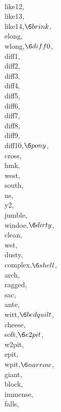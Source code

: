 \\{like12},\\{like13},\\{like14},{}$\6
\\{brink}${},\\{elong},\\{wlong},{}$\6
\\{diff0}${},\\{diff1},\\{diff2},\\{diff3},\\{diff4},\\{diff5},%
\\{diff6},\\{diff7},\\{diff8},\\{diff9},\\{diff10},{}$\6
\\{pony}${},\\{cross},\\{hmk},\\{west},\\{south},\\{ns},%
\\{y2},\\{jumble},\\{windoe},{}$\6
\\{dirty}${},\\{clean},\\{wet},\\{dusty},\\{complex},{}$\6
\\{shell}${},\\{arch},\\{ragged},\\{sac},\\{ante},\\{witt},{}$\6
\\{bedquilt}${},\\{cheese},\\{soft},{}$\6
\\{e2pit}${},\\{w2pit},\\{epit},\\{wpit},{}$\6
\\{narrow}${},\\{giant},\\{block},\\{immense},\\{falls},%
